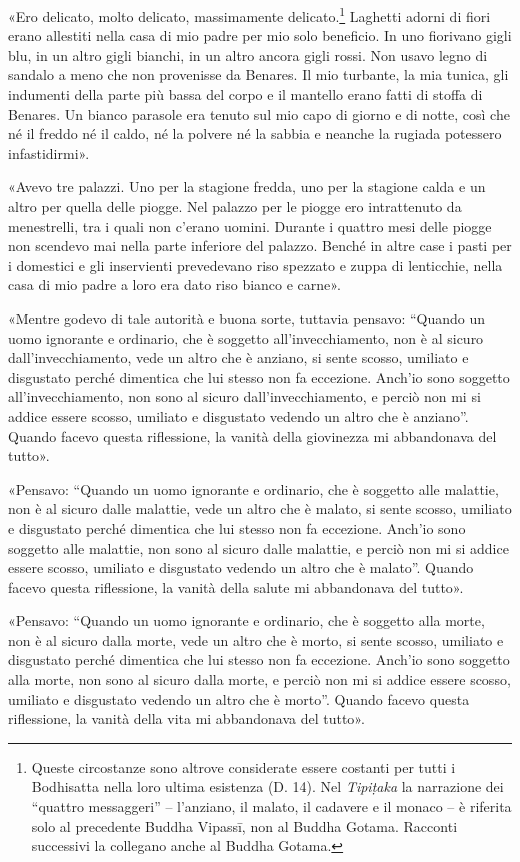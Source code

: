  «Ero delicato, molto delicato, massimamente
delicato.\footnote{Queste circostanze sono altrove considerate essere costanti
  per tutti i Bodhisatta nella loro ultima esistenza (D. 14). Nel
  \emph{Tipiṭaka} la narrazione dei “quattro messaggeri” – l’anziano, il malato,
  il cadavere e il monaco – è riferita solo al precedente Buddha Vipassī, non al
  Buddha Gotama. Racconti successivi la collegano anche al Buddha Gotama.}
Laghetti adorni di fiori erano allestiti nella casa di mio padre per mio solo
beneficio. In uno fiorivano gigli blu, in un altro gigli bianchi, in un altro
ancora gigli rossi. Non usavo legno di sandalo a meno che non provenisse da
Benares. Il mio turbante, la mia tunica, gli indumenti della parte più bassa del
corpo e il mantello erano fatti di stoffa di Benares. Un bianco parasole era
tenuto sul mio capo di giorno e di notte, così che né il freddo né il caldo, né
la polvere né la sabbia e neanche la rugiada potessero infastidirmi».

«Avevo tre palazzi. Uno per la stagione fredda, uno per la stagione calda e un
altro per quella delle piogge. Nel palazzo per le piogge ero intrattenuto da
menestrelli, tra i quali non c’erano uomini. Durante i quattro mesi delle piogge
non scendevo mai nella parte inferiore del palazzo. Benché in altre case i pasti
per i domestici e gli inservienti prevedevano riso spezzato e zuppa di
lenticchie, nella casa di mio padre a loro era dato riso bianco e carne».

«Mentre godevo di tale autorità e buona sorte, tuttavia pensavo: “Quando un uomo
ignorante e ordinario, che è soggetto all’invecchiamento, non è al sicuro
dall’invecchiamento, vede un altro che è anziano, si sente scosso, umiliato e
disgustato perché dimentica che lui stesso non fa eccezione. Anch’io sono
soggetto all’invecchiamento, non sono al sicuro dall’invecchiamento, e perciò
non mi si addice essere scosso, umiliato e disgustato vedendo un altro che è
anziano”. Quando facevo questa riflessione, la vanità della giovinezza mi
abbandonava del tutto».

«Pensavo: “Quando un uomo ignorante e ordinario, che è soggetto alle malattie,
non è al sicuro dalle malattie, vede un altro che è malato, si sente scosso,
umiliato e disgustato perché dimentica che lui stesso non fa eccezione. Anch’io
sono soggetto alle malattie, non sono al sicuro dalle malattie, e perciò non mi
si addice essere scosso, umiliato e disgustato vedendo un altro che è malato”.
Quando facevo questa riflessione, la vanità della salute mi abbandonava del
tutto».

«Pensavo: “Quando un uomo ignorante e ordinario, che è soggetto alla morte, non
è al sicuro dalla morte, vede un altro che è morto, si sente scosso, umiliato e
disgustato perché dimentica che lui stesso non fa eccezione. Anch’io sono
soggetto alla morte, non sono al sicuro dalla morte, e perciò non mi si addice
essere scosso, umiliato e disgustato vedendo un altro che è morto”. Quando
facevo questa riflessione, la vanità della vita mi abbandonava del tutto».


